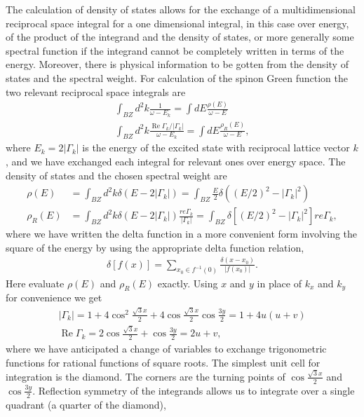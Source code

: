 \documentclass[aps,pra,preprint,groupedaddress]{revtex4-1}
\DeclareMathOperator{\re}{Re}
\newcommand{\1}{\mathds{1}}
\begin{document}
The calculation of density of states allows for the exchange of a multidimensional reciprocal space integral for a one dimensional integral, in this case over energy, of the product of the integrand and the density of states, or more generally some spectral function if the integrand cannot be completely written in terms of the energy. Moreover, there is physical information to be gotten from the density of states and the spectral weight. For calculation of the spinon Green function the two relevant reciprocal space integrals are
\begin{align}
\int_{BZ}d^2k \frac{1}{\omega - E_k} = \int dE \frac{\rho(E)}{\omega - E} \\
\int_{BZ}d^2k \frac{\re \Gamma_k / |\Gamma_k|}{\omega - E_k} = \int dE \frac{\rho_R(E)}{\omega - E},
\end{align}
where $E_k = 2|\Gamma_k|$ is the energy of the excited state with reciprocal lattice vector $k$, and we have exchanged each integral for relevant ones over energy space. The density of states and the chosen spectral weight are
\begin{align}
\rho(E) &= \int_{BZ}d^2k \delta\left( E - 2|\Gamma_k| \right) = \int_{BZ} \frac{E}{2} \delta\left( (E/2)^2 - |\Gamma_k|^2 \right)  \\
\rho_R(E) &= \int_{BZ}d^2k \delta\left( E - 2|\Gamma_k| \right) \frac{re \Gamma_k}{|\Gamma_k|} = \int_{BZ} \delta\left[ (E/2)^2 - |\Gamma_k|^2 \right] re \Gamma_k,
\end{align}
where we have written the delta function in a more convenient form involving the square of the energy by using the appropriate delta function relation,
\begin{align}
\delta[f(x)] = \sum_{x_0 \in  f^{-1}(0)} \frac{\delta(x-x_0)}{|f(x_0)|}.
\end{align}
Here evaluate $\rho(E)$ and $\rho_R(E)$ exactly. Using $x$ and $y$ in place of $k_x$ and $k_y$ for convenience we get 
\begin{align*}
|\Gamma_k| = 1 + 4 \cos^2 \frac{\sqrt{3}x}{2} + 4 \cos \frac{\sqrt{3}x}{2} \cos \frac{3y}{2} = 1+4u(u+v)\\
\re \Gamma_k = 2 \cos \frac{\sqrt{3}x}{2} + \cos \frac{3y}{2} = 2u + v,
\end{align*}
where we have anticipated a change of variables to exchange trigonometric functions for rational functions of square roots. The simplest unit cell for integration is the diamond. The corners are the turning points of $\cos \frac{\sqrt{3}x}{2}$ and $\cos \frac{3y}{2}$. Reflection symmetry of the integrands allows us to integrate over a single quadrant (a quarter of the diamond),
\end{document}

